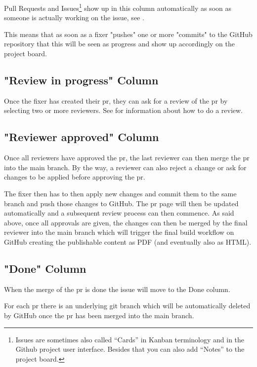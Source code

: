 Pull Requests and Issues\footnote{Issues are sometimes also 
called “Cards” in Kanban terminology and in the Github project 
user interface.
Besides that you can also add “Notes” to the project board.} 
show up in this column automatically as soon as someone is 
actually working on the issue, see .

This means that as soon as a fixer "pushes" one or more "commits" 
to the GitHub repository that this will be seen as progress 
and show up accordingly on the project board.

\subsection{"Review in progress" Column}

Once the fixer has created their \gls{pr}, they can ask 
for a review of the \gls{pr} by selecting two or more reviewers. 
See  for information about how to do a review.

\subsection{"Reviewer approved" Column}

Once all reviewers have approved the \gls{pr}, 
the last reviewer can then merge the \gls{pr} into the main branch. 
By the way, a reviewer can also reject a change or ask for 
changes to be applied before approving the \gls{pr}. 

The fixer then has to then apply new changes and commit 
them to the same branch and push those changes to GitHub. 
The \gls{pr} page will then be updated automatically and a subsequent 
review process can then commence.
As said above, once all approvals are given, 
the changes can then be merged by the final reviewer 
into the main branch which will trigger the final build 
workflow on GitHub creating the publishable content as 
PDF (and eventually also as HTML).

\subsection{"Done" Column}
\label{subsec:ekg-mm-process-done-column}

When the merge of the \gls{pr} is done the issue will move to 
the Done column. 

For each \gls{pr} there is an underlying git branch which 
will be automatically deleted by GitHub once the \gls{pr} 
has been merged into the main branch.

